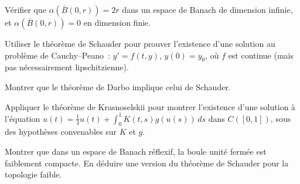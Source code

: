 \begin{exercice}
V\'erifier que $\alpha(\overline{B}(0, r)) = 2r$ dans un espace de Banach de
dimension infinie, et $\alpha(\overline{B}(0, r)) = 0$ en dimension finie.
\end{exercice}

\begin{exercice}
Utiliser le th\'eor\`eme de Schauder pour prouver l'existence d'une solution au
probl\`eme de Cauchy--Peano~: $y' = f(t,y)$, $y(0) = y_0$, o\`u $f$ est continue
(mais pas n\'ecessairement lipschitzienne).
\end{exercice}

\begin{exercice}
Montrer que le th\'eor\`eme de Darbo implique celui de Schauder.
\end{exercice}

\begin{exercice}
Appliquer le th\'eor\`eme de Krasnoselskii pour montrer l'existence d'une solution
\`a l'\'equation $u(t) = \frac{1}{3} u(t) + \int_0^1 K(t,s) g(u(s)) \, ds$ dans
$C([0,1])$, sous des hypoth\`eses convenables sur $K$ et $g$.
\end{exercice}

\begin{exercice}
Montrer que dans un espace de Banach r\'eflexif, la boule unit\'e ferm\'ee est
faiblement compacte. En d\'eduire une version du th\'eor\`eme de Schauder pour la
topologie faible.
\end{exercice}
